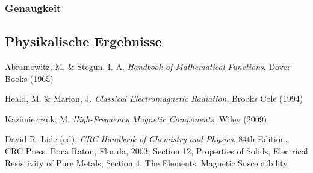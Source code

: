 \documentclass[10pt,a4paper]{article}
\begin{document}
\subsubsection{Genaugkeit}

\subsection{Physikalische Ergebnisse}
\label{ssec:physikalischeergebnisse}

\begin{thebibliography}{9}

Abramowitz, M. \& Stegun, I. A.
\emph{Handbook of Mathematical Functions},
Dover Books (1965)

Heald, M. \& Marion, J.
\emph{Classical Electromagnetic Radiation},
Brooks Cole (1994)

Kazimierczuk, M.
\emph{High-Frequency Magnetic Components},
Wiley (2009)

David R. Lide (ed),
\emph{CRC Handbook of Chemistry and Physics},
84th Edition. CRC Press. Boca Raton, Florida, 2003;
Section 12, Properties of Solids; Electrical Resistivity of Pure Metals;
Section 4, The Elements: Magnetic Susceptibility

\end{thebibliography}
\end{document}
